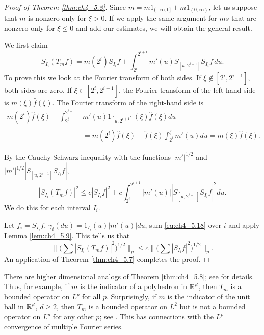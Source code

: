 \begin{proof}[Proof of Theorem \ref{thm:ch4_5.8}]
Since $m = m1_{(-\infty,0]} + m1_{(0,\infty)}$, let us suppose that $m$ is nonzero only for $\xi > 0$. If we apply the same argument for $ms$ that are nonzero only for $\xi \leq 0$ and add our estimates, we will obtain the general result.

We first claim
\[
    S_{I_i}(T_m f) = m(2^i)S_{I_i}f + \int_{2^i}^{2^{i+1}} m'(u)S_{[u,2^{i+1}]}S_{I_i}f\,du.
\]
To prove this we look at the Fourier transform of both sides. If $\xi \notin [2^i, 2^{i+1}]$, both sides are zero. If $\xi \in [2^i, 2^{i+1}]$, the Fourier transform of the left-hand side is $m(\xi)\widehat{f}(\xi)$. The Fourier transform of the right-hand side is
\begin{align*}
    m(2^i)\widehat{f}(\xi) + \int_{2^i}^{2^{i+1}} &m'(u)1_{[u,2^{i+1}]}(\xi)\widehat{f}(\xi)du \\
    &= m(2^i)\widehat{f}(\xi) + \widehat{f}(\xi)\int_{2^i}^\xi m'(u)du = m(\xi)\widehat{f}(\xi).
\end{align*}

By the Cauchy-Schwarz inequality with the functions $|m'|^{1/2}$ and $|m'|^{1/2}|S_{[u,2^{i+1}]}S_{I_i}f|$,
\begin{equation}\label{eq:ch4_5.18}
    |S_{I_i}(T_m f)|^2 \leq c|S_{I_i}f|^2 + c\int_{2^i}^{2^{i+1}} |m'(u)| |S_{[u,2^{i+1}]}S_{I_i}f|^2 du.
\end{equation}
We do this for each interval $I_i$.

Let $f_i = S_{I_i}f$, $\gamma_i(du) = 1_{I_i}(u)|m'(u)|du$, sum \eqref{eq:ch4_5.18} over $i$ and apply Lemma \ref{lem:ch4_5.9}. This tells us that
\[
    \Big\|\Big(\sum|S_{I_i}(T_m f)|^2\Big)^{1/2}\Big\|_p \leq c\Big\|\Big(\sum|S_{I_i}f|^2\Big)^{1/2}\Big\|_p.
\]
An application of Theorem \ref{thm:ch4_5.7} completes the proof.
\end{proof}



There are higher dimensional analogs of Theorem \ref{thm:ch4_5.8}; see \cite{Stein1970a} for details. Thus, for example, if $m$ is the indicator of a polyhedron in $\mathbb{R}^d$, then $T_m$ is a bounded operator on $L^p$ for all $p$. Surprisingly, if $m$ is the indicator of the unit ball in $\mathbb{R}^d$, $d \geq 2$, then $T_m$ is a bounded operator on $L^2$ but is not a bounded operator on $L^p$ for any other $p$; see \cite{Fefferman1971}. This has connections with the $L^p$ convergence of multiple Fourier series.

